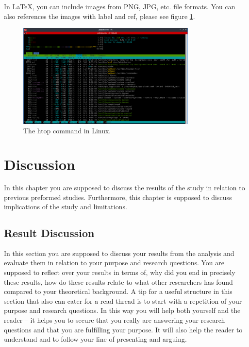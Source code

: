 \documentclass[a4paper, 12pt]{report}
\begin{document}
In LaTeX, you can include images from PNG, JPG, etc. file formats. You can also references the images with label and ref, please see figure \ref{fig:htop}.

\begin{figure}[ht!]
  \label{fig:htop}
  \centering %
  \includegraphics[width=0.8\textwidth]{img/htop.png}
  \caption{The htop command in Linux.}
\end{figure}

\medskip\lipsum[3]

\chapter{Discussion}
\label{sec:discussion}

\textcolor{jupurple}{
In this chapter you are supposed to discuss the results of the study in relation to previous preformed studies. Furthermore, this chapter is supposed to discuss implications of the study and limitations.
}

\section{Result Discussion}

\textcolor{jupurple}{
In this section you are supposed to discuss your results from the analysis and evaluate them in relation to your purpose and research questions. You are supposed to reflect over your results in terms of, why did you end in precisely these results, how do these results relate to what other researchers has found compared to your theoretical background.
A tip for a useful structure in this section that also can cater for a read thread is to start with a repetition of your purpose and research questions. In this way you will help both yourself and the reader – it helps you to secure that you really are answering your research questions and that you are fulfilling your purpose. It will also help the reader to understand and to follow your line of presenting and arguing.
}
\end{document}
